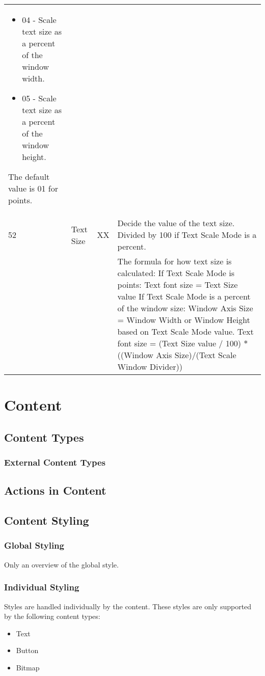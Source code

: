 \documentclass{report}
\begin{document}
\begin{tabularx}{\textwidth}{l|l|l|X}
\begin{itemize}
\item 04 - Scale text size as a percent of the window width.
\item 05 - Scale text size as a percent of the window height.
\end{itemize}
The default value is 01 for points.\\
52 & Text Size & XX & Decide the value of the text size. Divided by 100 if Text Scale Mode is a percent.\\
& & & \makecell[tl]{The formula for how text size is calculated: \\
If Text Scale Mode is points:\\
Text font size = Text Size value\\
If Text Scale Mode is a percent of the window size:\\
Window Axis Size = Window Width or Window Height based on Text Scale Mode value.\\
Text font size = (Text Size value $/$ 100) $*$ ((Window Axis Size)$/$(Text Scale Window Divider))
}


\end{tabularx}
\section{Content}
\subsection{Content Types}
\subsubsection{External Content Types} %
\subsection{Actions in Content}
\subsection{Content Styling}
\subsubsection{Global Styling}
Only an overview of the global style.
\subsubsection{Individual Styling}
Styles are handled individually by the content. These styles are only supported by the following content types:
\begin{itemize}
\item Text
\item Button
\item Bitmap
\end{itemize}
\end{document}
